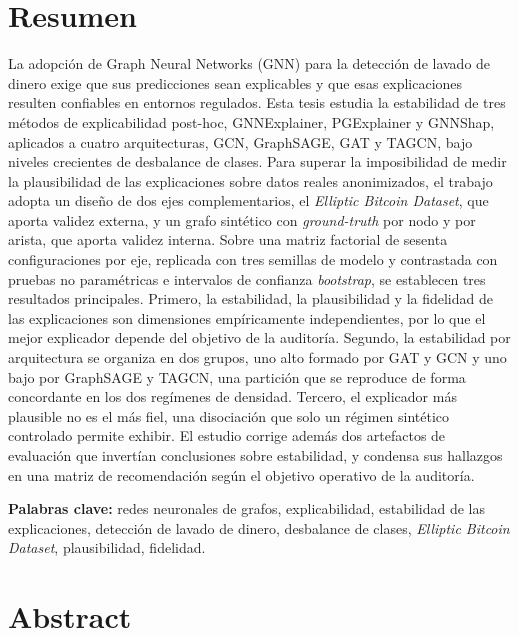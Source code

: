 \documentclass[a4paper,oneside,12pt]{book}
\begin{document}
\chapter*{Resumen}

La adopción de Graph Neural Networks (GNN) para la detección de lavado de dinero exige que sus predicciones sean explicables y que esas explicaciones resulten confiables en entornos regulados. Esta tesis estudia la estabilidad de tres métodos de explicabilidad post-hoc, GNNExplainer, PGExplainer y GNNShap, aplicados a cuatro arquitecturas, GCN, GraphSAGE, GAT y TAGCN, bajo niveles crecientes de desbalance de clases. Para superar la imposibilidad de medir la plausibilidad de las explicaciones sobre datos reales anonimizados, el trabajo adopta un diseño de dos ejes complementarios, el \textit{Elliptic Bitcoin Dataset}, que aporta validez externa, y un grafo sintético con \textit{ground-truth} por nodo y por arista, que aporta validez interna. Sobre una matriz factorial de sesenta configuraciones por eje, replicada con tres semillas de modelo y contrastada con pruebas no paramétricas e intervalos de confianza \textit{bootstrap}, se establecen tres resultados principales. Primero, la estabilidad, la plausibilidad y la fidelidad de las explicaciones son dimensiones empíricamente independientes, por lo que el mejor explicador depende del objetivo de la auditoría. Segundo, la estabilidad por arquitectura se organiza en dos grupos, uno alto formado por GAT y GCN y uno bajo por GraphSAGE y TAGCN, una partición que se reproduce de forma concordante en los dos regímenes de densidad. Tercero, el explicador más plausible no es el más fiel, una disociación que solo un régimen sintético controlado permite exhibir. El estudio corrige además dos artefactos de evaluación que invertían conclusiones sobre estabilidad, y condensa sus hallazgos en una matriz de recomendación según el objetivo operativo de la auditoría.

\vspace{0.4cm}
\noindent\textbf{Palabras clave:} redes neuronales de grafos, explicabilidad, estabilidad de las explicaciones, detección de lavado de dinero, desbalance de clases, \textit{Elliptic Bitcoin Dataset}, plausibilidad, fidelidad.

\chapter*{Abstract}
\end{document}
